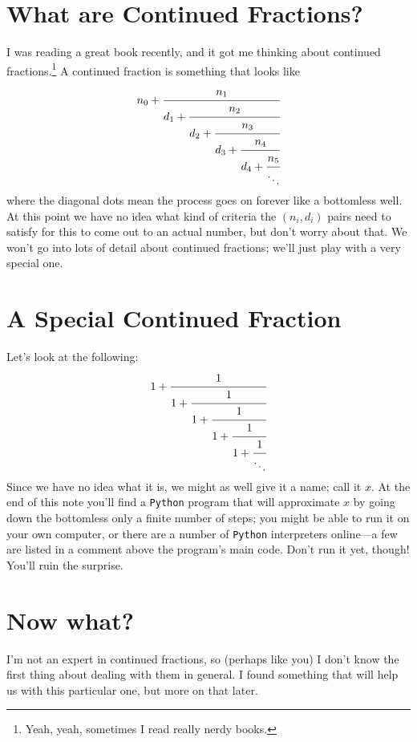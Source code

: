 \documentclass[11pt]{article}
\begin{document}
\section*{What are Continued Fractions?}

I was reading a great book recently, and it got me thinking about continued
fractions.\footnote{Yeah, yeah, sometimes I read really nerdy books.}
A continued fraction is something that looks like
\[
    n_0 +
        \cfrac{n_1}
            {d_1 + \cfrac{n_2}
                {d_2 + \cfrac{n_3}
                    {d_3 + \cfrac{n_4}
                        {d_4 + \cfrac{n_5}
                            {\ddots}
                        }
                    }
                }
            }
\]
where the diagonal dots mean the process goes on forever like a bottomless
well.
At this point we have no idea what kind of criteria the $\left(n_i, d_i\right)$
pairs need to satisfy for this to come out to an actual number, but don't worry
about that.
We won't go into lots of detail about continued fractions; we'll just play with
a very special one.

\section*{A Special Continued Fraction}

Let's look at the following:
\[
    1 +
        \cfrac{1}
            {1 + \cfrac{1}
                {1 + \cfrac{1}
                    {1 + \cfrac{1}
                        {1 + \cfrac{1}
                            {\ddots}
                        }
                    }
                }
            }
\]
Since we have no idea what it is, we might as well give it a name; call it $x$.
At the end of this note you'll find a \texttt{Python} program that will
approximate $x$ by going down the bottomless only a finite number of steps; you
might be able to run it on your own computer, or there are a number of
\texttt{Python} interpreters online---a few are listed in a comment above the
program's main code.
Don't run it yet, though!
You'll ruin the surprise.

\section*{Now what?}

I'm not an expert in continued fractions, so (perhaps like you) I don't know
the first thing about dealing with them in general.
I found something that will help us with this particular one, but more on that
later.
\end{document}
